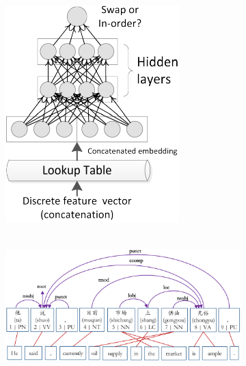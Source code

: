\documentclass[letterpaper]{article}
\begin{document}
\begin{figure}[htb]
\centering
\begin{subfigure}[t]{0.2\textwidth}
\includegraphics[width=\textwidth]{archi.pdf}
\caption{~}
\label{fig:illustration_archi}
\end{subfigure}
\begin{subfigure}[t]{0.52\textwidth}
\includegraphics[width=\textwidth]{traininst.pdf}
\caption{~}
\label{fig:illustration_align}
\end{subfigure}

\end{figure}
\end{document}
